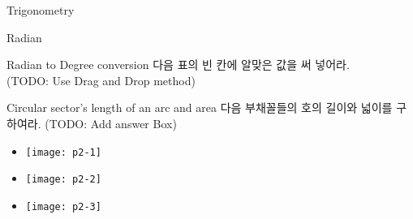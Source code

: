
\begin{edXchapter}{Trigonometry}
\begin{edXsection}{Radian}
\begin{edXvertical}


\begin{edXproblem}{ Radian to Degree conversion }
다음 표의 빈 칸에 알맞은 값을 써 넣어라.\\ 
(TODO: Use Drag and Drop method) \\



\begin{edXsolution}

\end{edXsolution}

\end{edXproblem}


\begin{edXproblem}{ Circular sector's length of an arc and area }
다음 부채꼴들의 호의 길이와 넓이를 구하여라.
(TODO: Add answer Box)

\begin{itemize}

\item
\texttt{[image: p2-1]}\\ 
\item
\texttt{[image: p2-2]}\\ 
\item
\texttt{[image: p2-3]}\\ 

\end{itemize}



\end{edXproblem}

\end{edXvertical}
\end{edXsection}
\end{edXchapter}
